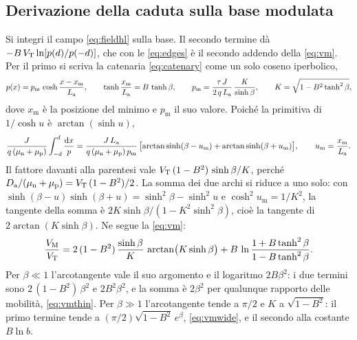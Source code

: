 \documentclass[10pt,a4paper]{scrartcl}
\let\newcommand\pdvaluedefine
\newcommand{\VT}{V_\mathrm{T}}
\newcommand{\diff}{\mathrm{d}}
\newcommand{\Da}{D_\mathrm{a}}
\newcommand{\La}{L_\mathrm{a}}
\newcommand{\mun}{\mu_\mathrm{n}}
\newcommand{\mup}{\mu_\mathrm{p}}
\newcommand{\VM}{V_\mathrm{M}}
\begin{document}
\subsection{Derivazione della caduta sulla base modulata}
\label{app:vm}
Si integri il campo \eqref{eq:fieldhl} sulla base. Il secondo termine dà $-B\,\VT\ln[p(d)/p(-d)]$, che con le \eqref{eq:edges} è il secondo addendo della \eqref{eq:vm}. Per il primo si scriva la catenaria \eqref{eq:catenary} come un solo coseno iperbolico,
\begin{equation}
p(x) = p_\mathrm{m}\,\cosh\frac{x - x_\mathrm{m}}{\La} , \qquad \tanh\frac{x_\mathrm{m}}{\La} = B\,\tanh\beta , \qquad
p_\mathrm{m} = \frac{\tau\,J}{2\,q\,\La}\,\frac{K}{\sinh\beta} , \qquad K = \sqrt{1 - B^2\tanh^2\beta} ,
\end{equation}
dove $x_\mathrm{m}$ è la posizione del minimo e $p_\mathrm{m}$ il suo valore. Poiché la primitiva di $1/\cosh u$ è $\arctan(\sinh u)$,
\begin{equation}
\frac{J}{q\,(\mun+\mup)}\int_{-d}^{d}\frac{\diff x}{p}
= \frac{J\,\La}{q\,(\mun+\mup)\,p_\mathrm{m}}\,\bigl[\arctan\sinh(\beta - u_\mathrm{m}) + \arctan\sinh(\beta + u_\mathrm{m})\bigr] , \qquad u_\mathrm{m} = \frac{x_\mathrm{m}}{\La} .
\end{equation}
Il fattore davanti alla parentesi vale $\VT\,(1-B^2)\,\sinh\beta/K$, perché $\Da/(\mun+\mup) = \VT\,(1-B^2)/2$. La somma dei due archi si riduce a uno solo: con $\sinh(\beta-u)\sinh(\beta+u) = \sinh^2\beta - \sinh^2 u$ e $\cosh^2 u_\mathrm{m} = 1/K^2$, la tangente della somma è $2K\sinh\beta/(1 - K^2\sinh^2\beta)$, cioè la tangente di $2\arctan(K\sinh\beta)$. Ne segue la \eqref{eq:vm}:
\begin{equation}
\frac{\VM}{\VT} = 2\,(1-B^2)\,\frac{\sinh\beta}{K}\,\arctan\bigl(K\sinh\beta\bigr) + B\,\ln\frac{1 + B\tanh^2\beta}{1 - B\tanh^2\beta} .
\end{equation}
Per $\beta \ll 1$ l'arcotangente vale il suo argomento e il logaritmo $2B\beta^2$: i due termini sono $2\,(1-B^2)\,\beta^2$ e $2B^2\beta^2$, e la somma è $2\beta^2$ per qualunque rapporto delle mobilità, \eqref{eq:vmthin}. Per $\beta \gg 1$ l'arcotangente tende a $\pi/2$ e $K$ a $\sqrt{1-B^2}$: il primo termine tende a $(\pi/2)\sqrt{1-B^2}\,e^{\beta}$, \eqref{eq:vmwide}, e il secondo alla costante $B\ln b$.
\end{document}
